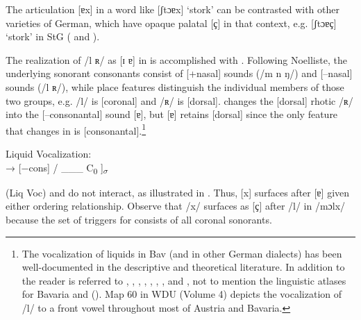 The articulation [ɐx] in a word like [ʃtɔɐx] ‘stork’ can be contrasted with other varieties of German, which have opaque palatal [{ҫ}] in that context, e.g. [ʃtɔɐ{ҫ] ‘stork’ in} StG ( and ).

The realization of /l ʀ/ as [ɪ ɐ] in  is accomplished with . Following Noelliste, the underlying sonorant consonants consist of [+nasal] sounds (/m n ŋ/) and [--nasal]  sounds (/l ʀ/), while place features distinguish the individual members of those two groups, e.g. /l/ is [coronal] and /ʀ/ is [dorsal].  changes the [dorsal] rhotic /ʀ/ into the [--consonantal] sound [ɐ], but [ɐ] retains [dorsal] since the only feature that changes in  is [consonantal].\footnote{The vocalization of liquids in Bav (and in other German dialects) has been well-documented in the descriptive and theoretical literature. In addition to \citet{Noelliste2017} the reader is referred to \citet[107ff.]{Schmeller1821}, \citet{Selmer1933},  \citet[119ff.]{Kranzmayer1956}, \citet{Rein1974}, \citet{Haas1983}, \citet{Merkle1984}, \citet{Glover2014}, and \citet{Noelliste2019}, not to mention the linguistic atlases for Bavaria and  (). Map 60 in WDU (Volume 4) depicts the vocalization of /l/ to a front vowel throughout most of Austria and Bavaria.}

\ea%
Liquid Vocalization:\label{ex:3:26}\smallskip\\
 → [−cons] / \_\_\_ C\textsubscript{0} ]\textsubscript{${\sigma}$}
\z 

 (Liq Voc) and  do not interact, as illustrated in . Thus, [x] surfaces after [ɐ] given either ordering relationship. Observe that /x/ surfaces as [{ҫ}] after /l/ in /mɔlx/ because the set of triggers for  consists of all coronal sonorants.

